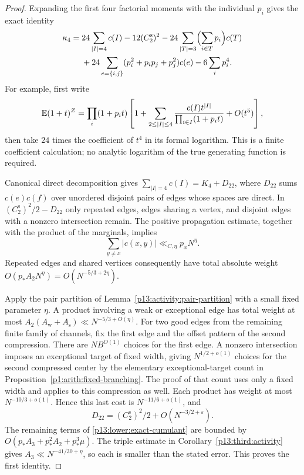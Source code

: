 \begin{proof}
Expanding the first four factorial moments with the individual $p_i$
gives the exact identity
\begin{align}
 \kappa_4={}&24\sum_{|I|=4}c(I)-12(C_2^{\mathrm s})^2
 -24\sum_{|T|=3}\Bigl(\sum_{i\in T}p_i\Bigr)c(T)\notag\\
 &+24\sum_{e=\{i,j\}}(p_i^2+p_ip_j+p_j^2)c(e)
 -6\sum_i p_i^4.
 \label{p13:lower:exact-cumulant}
\end{align}
For example, first write
\[
 \mathbb E(1+t)^Z=\prod_i(1+p_it)
 \left[1+\sum_{2\leq|I|\leq4}
       \frac{c(I)t^{|I|}}{\prod_{i\in I}(1+p_it)}+O(t^5)\right],
\]
then take $24$ times the coefficient of $t^4$ in its formal logarithm.
This is a finite coefficient calculation; no analytic logarithm of the
true generating function is required.

Canonical direct decomposition gives
$\sum_{|I|=4}c(I)=K_4+D_{22}$, where $D_{22}$ sums
$c(e)c(f)$ over unordered disjoint pairs of edges whose spaces are direct.
In $(C_2^{\mathrm s})^2/2-D_{22}$ only repeated edges, edges sharing a
vertex, and disjoint edges with a nonzero intersection remain.
The positive propagation estimate, together with the product of the
marginals, implies
\[
 \sum_{y\ne x}|c(x,y)|\ll_{C,\eta}p_xN^\eta.
\]
Repeated edges and shared vertices consequently have total absolute
weight $O(p_*A_2N^\eta)=O(N^{-5/3+2\eta})$.

Apply the pair partition of Lemma~\ref{p13:activity:pair-partition} with
a small fixed parameter $\eta$. A product involving a weak or exceptional
edge has total weight at most
$A_2(A_{\mathrm w}+A_{\mathrm s})
\ll N^{-5/3+O(\eta)}$.
For two good edges from the remaining finite family of channels, fix the
first edge and the offset pattern of the second compression. There are
$NB^{O(1)}$ choices for the first edge. A nonzero intersection imposes
an exceptional target of fixed width, giving $N^{1/2+o(1)}$ choices for
the second compressed center by the elementary exceptional-target count
in Proposition~\ref{p1:arith:fixed-branching}. The proof of that count
uses only a fixed width and applies to this compression as well.
Each product has weight at most $N^{-10/3+o(1)}$. Hence this last cost is
$N^{-11/6+o(1)}$, and
\[
 D_{22}=(C_2^{\mathrm s})^2/2+O(N^{-3/2+\varepsilon}).
\]
The remaining terms of \eqref{p13:lower:exact-cumulant} are bounded by
$O(p_*A_3+p_*^2A_2+p_*^3\mu)$.
The triple estimate in Corollary~\ref{p13:third:activity} gives
$A_3\ll N^{-41/30+\eta}$, so each is smaller than the stated error.
This proves the first identity.


\end{proof}
